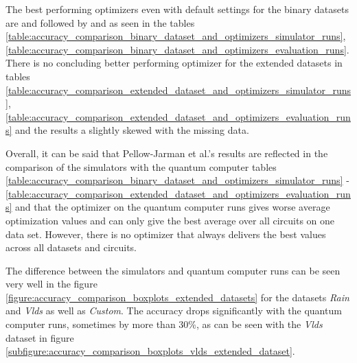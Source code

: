The best performing optimizers even with default settings for the binary datasets are  and  followed by  and  as seen in the tables \ref{table:accuracy_comparison_binary_dataset_and_optimizers_simulator_runs}, \ref{table:accuracy_comparison_binary_dataset_and_optimizers_evaluation_runs}. There is no concluding better performing optimizer for the extended datasets in tables \ref{table:accuracy_comparison_extended_dataset_and_optimizers_simulator_runs}, \ref{table:accuracy_comparison_extended_dataset_and_optimizers_evaluation_runs} and the results a slightly skewed with the missing  data.\par
Overall, it can be said that Pellow-Jarman et al.\cite{pellow-jarman_comparison_2021}'s results are reflected in the comparison of the simulators with the quantum computer tables \ref{table:accuracy_comparison_binary_dataset_and_optimizers_simulator_runs} - \ref{table:accuracy_comparison_extended_dataset_and_optimizers_evaluation_runs} and that the  optimizer on the quantum computer runs gives worse average optimization values and can only give the best average over all circuits on one data set. However, there is no optimizer that always delivers the best values across all datasets and circuits.\par
The difference between the simulators and quantum computer runs can be seen very well in the figure \ref{figure:accuracy_comparison_boxplots_extended_datasets} for the datasets \textit{Rain} and \textit{Vlds} as well as \textit{Custom}. The accuracy drops significantly with the quantum computer runs, sometimes by more than 30\%, as can be seen with the \textit{Vlds} dataset in figure \ref{subfigure:accuracy_comparison_boxplots_vlds_extended_dataset}. 

